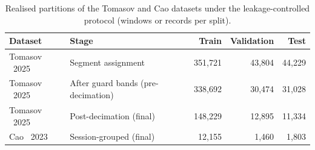 \begin{table}[!htbp]
	\centering
	\caption{Realised partitions of the Tomasov and Cao datasets under the leakage-controlled protocol (windows or records per split).}
	\label{tab:split_summary}
	\small
	\begin{tabular}{@{}llrrr@{}}
		\toprule
		\textbf{Dataset} & \textbf{Stage} & \textbf{Train} & \textbf{Validation} & \textbf{Test}\\
		\midrule
		Tomasov \etal\ 2025 & Segment assignment                   & 351{,}721 & 43{,}804 & 44{,}229\\
		Tomasov \etal\ 2025 & After guard bands (pre-decimation)   & 338{,}692 & 30{,}474 & 31{,}028\\
		Tomasov \etal\ 2025 & Post-decimation (final)              & 148{,}229 & 12{,}895 & 11{,}334\\
		\midrule
		Cao \etal\ 2023     & Session-grouped (final)              & 12{,}155  & 1{,}460  & 1{,}803\\
		\bottomrule
	\end{tabular}
\end{table}


